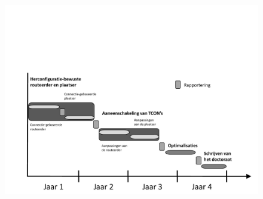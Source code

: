 \documentclass[a4paper,oneside,12pt]{article}
\begin{document}
\begin{figure}[ht]
\centering
\includegraphics[width = \textwidth,trim = 0mm 0mm 0mm 70mm, clip]{tijdschema.pdf}
\end{figure}

\newpage




%
%
\end{document}
